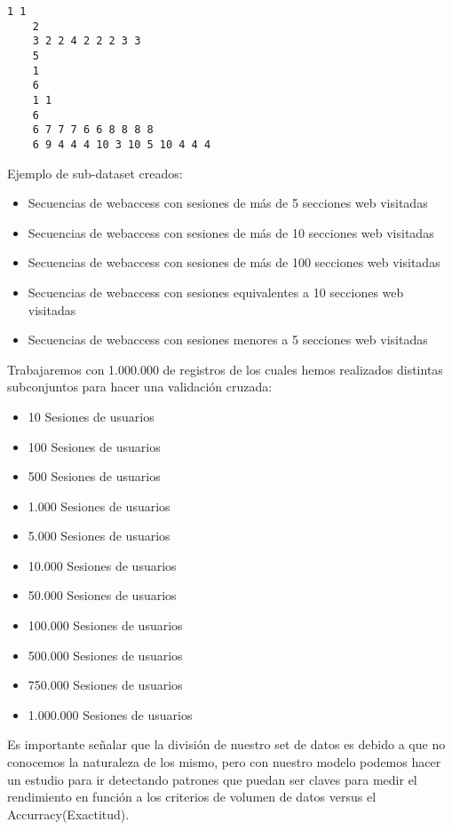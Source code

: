 	
	\begin{lstlisting}[frame=single,basicstyle=\ttfamily\tiny,]
	1 1 
	2 
	3 2 2 4 2 2 2 3 3 
	5 
	1 
	6 
	1 1 
	6 
	6 7 7 7 6 6 8 8 8 8 
	6 9 4 4 4 10 3 10 5 10 4 4 4 
	\end{lstlisting}


 Ejemplo de sub-dataset creados:

\begin{itemize}
	\item Secuencias de webaccess con sesiones de más de 5 secciones web visitadas
	\item Secuencias de webaccess con sesiones de más de 10 secciones web visitadas
	\item Secuencias de webaccess con sesiones de más de 100 secciones web visitadas
	\item Secuencias de webaccess con sesiones equivalentes a 10 secciones web visitadas
	\item Secuencias de webaccess con sesiones menores a 5 secciones web visitadas
\end{itemize}


Trabajaremos con 1.000.000 de registros de los cuales hemos realizados distintas subconjuntos para hacer una validación cruzada:

\begin{itemize}
	\item 10 Sesiones de usuarios
	\item 100 Sesiones de usuarios
	\item 500 Sesiones de usuarios
	\item 1.000 Sesiones de usuarios
	\item 5.000 Sesiones de usuarios
	\item 10.000 Sesiones de usuarios
	\item 50.000 Sesiones de usuarios
	\item 100.000 Sesiones de usuarios
	\item 500.000 Sesiones de usuarios
	\item 750.000 Sesiones de usuarios
	\item 1.000.000 Sesiones de usuarios
\end{itemize}


Es importante señalar que la división de nuestro set de datos es debido a que no conocemos la naturaleza de los mismo, pero con nuestro modelo podemos hacer un estudio para ir detectando patrones que puedan ser claves para medir el rendimiento en función a los criterios de volumen de datos versus el Accurracy(Exactitud).






